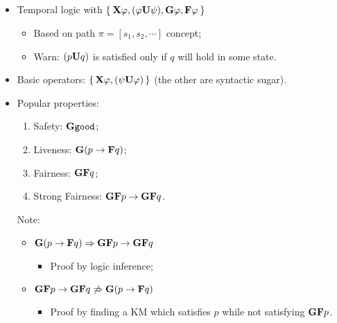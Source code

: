 \subsection{\LTL}

    \begin{itemize}

    \item   Temporal logic with
            $\Set{ \mathcal{\sf \bf X}\varphi, ({\varphi}\mathcal{\sf \bf U}{\psi}), \mathcal{\sf \bf G}\varphi, \mathcal{\sf \bf F}\varphi }$

        \begin{itemize}
        \item   Based on path $\pi = [s_1, s_2, \cdots ]$ concept;
        \item   Warn: $({p}\mathcal{\sf \bf U}{q})$ is satisfied only if $q$ will hold in
                some state.
        \end{itemize}

    \item   Basic operators: $\set{ \mathcal{\sf \bf X}\varphi, ({\psi}\mathcal{\sf \bf U}{\varphi}) }$ (the
            other are syntactic sugar).

    \item   Popular properties:

        \begin{enumerate}
        \item   Safety: $\mathcal{\sf \bf G}\mathcal{{\tt good}}$;
        \item   Liveness: $\mathcal{\sf \bf G}(p \rightarrow \mathcal{\sf \bf F}q)$;
        \item   Fairness: $\mathcal{\sf \bf G}\mathcal{\sf \bf F}q$;
        \item   Strong Fairness: $\mathcal{\sf \bf G}\mathcal{\sf \bf F}p \rightarrow \mathcal{\sf \bf G}\mathcal{\sf \bf F}q$.
        \end{enumerate}

        Note:
        \begin{itemize}
        \item   $\mathcal{\sf \bf G}(p \rightarrow \mathcal{\sf \bf F}q) \Rightarrow \mathcal{\sf \bf G}\mathcal{\sf \bf F}p \rightarrow \mathcal{\sf \bf G}\mathcal{\sf \bf F}q$
            \begin{itemize}
            \item   Proof by logic inference;
            \end{itemize}
        \item   $\mathcal{\sf \bf G}\mathcal{\sf \bf F}p \rightarrow \mathcal{\sf \bf G}\mathcal{\sf \bf F}q \not\Rightarrow
                 \mathcal{\sf \bf G}(p \rightarrow \mathcal{\sf \bf F}q)$
            \begin{itemize}
                \item   Proof by finding a KM which satisfies $p$ while not
                        satisfying $\mathcal{\sf \bf G}\mathcal{\sf \bf F}p$.
            \end{itemize}
        \end{itemize}

    \end{itemize}

